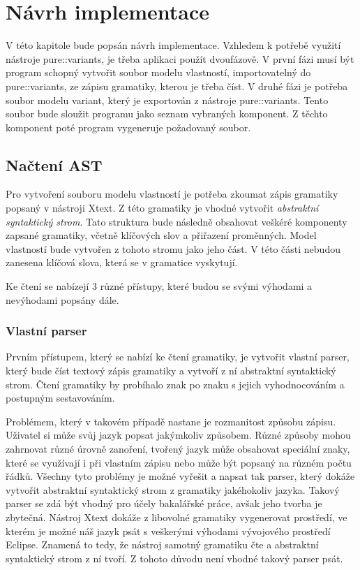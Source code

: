 \chapter{Návrh implementace}

V této kapitole bude popsán návrh implementace. Vzhledem k potřebě využití nástroje pure::variants, je třeba aplikaci použít dvoufázově. V první fázi musí být program schopný vytvořit soubor modelu vlastností, importovatelný do pure::variants, ze zápisu gramatiky, kterou je třeba číst. V druhé fázi je potřeba soubor modelu variant, který je exportován z nástroje pure::variants. Tento soubor bude sloužit programu jako seznam vybraných komponent. Z těchto komponent poté program vygeneruje požadovaný soubor. 

\section{Načtení AST}

Pro vytvoření souboru modelu vlastností je potřeba zkoumat zápis gramatiky popsaný v nástroji Xtext. Z této gramatiky je vhodné vytvořit \textit{abstraktní syntaktický strom}. Tato struktura bude následně obsahovat veškéré komponenty zapsané gramatiky, včetně klíčových slov a přiřazení proměnných. Model vlastností bude vytvořen z tohoto stromu jako jeho část. V této části nebudou zanesena klíčová slova, která se v gramatice vyskytují. 

Ke čtení se nabízejí 3 různé přístupy, které budou se svými výhodami a nevýhodami popsány dále.

\subsection{Vlastní parser}

Prvním přístupem, který se nabízí ke čtení gramatiky, je vytvořit vlastní parser, který bude číst textový zápis gramatiky a vytvoří z ní abstraktní syntaktický strom. Čtení gramatiky by probíhalo znak po znaku s jejich vyhodnocováním a postupným sestavováním.

Problémem, který v takovém případě nastane je rozmanitost způsobu zápisu. Uživatel si může svůj jazyk popsat jakýmkoliv způsobem. Různé způsoby mohou zahrnovat různé úrovně zanoření, tvořený jazyk může obsahovat speciální znaky, které se využívají i při vlastním zápisu nebo může být popsaný na různém počtu řádků. Všechny tyto problémy je možné vyřešit a napsat tak parser, který dokáže vytvořit abstraktní syntaktický strom z gramatiky jakéhokoliv jazyka. Takový parser se zdá být vhodný pro účely bakalářské práce, avšak jeho tvorba je zbytečná. Nástroj Xtext dokáže z libovolné gramatiky vygenerovat prostředí, ve kterém je možné náš jazyk psát s veškerými výhodami vývojového prostředí Eclipse. Znamená to tedy, že nástroj samotný gramatiku čte a abstraktní syntaktický strom z ní tvoří. Z tohoto důvodu není vhodné takový parser psát.

